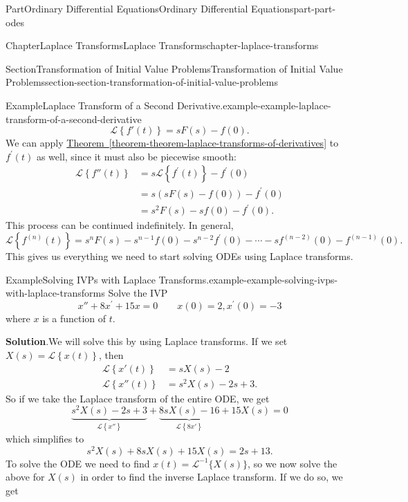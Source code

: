 \documentclass[twoside,10pt,]{book}
\newcommand{\blocktitlefont}{\relax}
\newcommand{\xreffont}{\relax}
\numberwithin{equation}{part}
\newcommand{\Laplace}[1]{\mathcal{L}\set{#1}}
\newcommand{\set}[1]{\left\{ #1 \right\}}
\newcommand{\qq}[1]{\quad\text{#1}\quad}
\begin{document}
\begin{partptx}{Part}{Ordinary Differential Equations}{}{Ordinary Differential Equations}{}{}{part-part-odes}
\begin{chapterptx}{Chapter}{Laplace Transforms}{}{Laplace Transforms}{}{}{chapter-laplace-transforms}
\begin{sectionptx}{Section}{Transformation of Initial Value Problems}{}{Transformation of Initial Value Problems}{}{}{section-section-transformation-of-initial-value-problems}
\begin{example}{Example}{Laplace Transform of a Second Derivative.}{example-example-laplace-transform-of-a-second-derivative}
\begin{equation*}
\Laplace{f'(t)} = sF(s)-f(0).
\end{equation*}
We can apply \hyperref[theorem-theorem-laplace-transforms-of-derivatives]{Theorem~{\xreffont\ref{theorem-theorem-laplace-transforms-of-derivatives}}} to \(f^\prime(t)\) as well, since it must also be piecewise smooth:%
\begin{align*}
\Laplace{f''(t)} &= s\Laplace{f^\prime(t)} - f^\prime(0)\\
&= s(sF(s)-f(0)) - f^\prime(0)\\
&= s^{2}F(s) - sf(0) - f^\prime(0)\text{.}
\end{align*}
This process can be continued indefinitely. In general,%
\begin{equation*}
\Laplace{f^{(n)}(t)} = s^{n}F(s) - s^{n-1}f(0) - s^{n-2}f^\prime(0) - \cdots -sf^{(n-2)}(0) - f^{(n-1)}(0).
\end{equation*}
This gives us everything we need to start solving ODEs using Laplace transforms.%
\end{example}
\begin{example}{Example}{Solving IVPs with Laplace Transforms.}{example-example-solving-ivps-with-laplace-transforms}%
Solve the IVP%
\begin{equation*}
x''+8x^\prime+15x = 0 \qq{} x(0) = 2, x^\prime(0) = -3
\end{equation*}
where \(x\) is a function of \(t\).%
\par\smallskip%
\noindent\textbf{\blocktitlefont Solution}.\hypertarget{solution-example-solving-ivps-with-laplace-transforms-c}{}\quad{}We will solve this by using Laplace transforms. If we set \(X(s) = \Laplace{x(t)}\), then%
\begin{align*}
\Laplace{x'(t)} &= sX(s) - 2\\
\Laplace{x''(t)} &= s^{2}X(s) - 2s +3\text{.}
\end{align*}
So if we take the Laplace transform of the entire ODE, we get%
\begin{equation*}
\underbrace{s^{2}X(s) - 2s + 3}_{\Laplace{x''}} + \underbrace{8sX(s) - 16}_{\Laplace{8x'}} + 15X(s) = 0
\end{equation*}
which simplifies to%
\begin{equation*}
s^{2}X(s)+8sX(s)+15X(s) = 2s+13.
\end{equation*}
To solve the ODE we need to find \(x(t) = \mathcal{L}^{-1}\{X(s)\}\), so we now solve the above for \(X(s)\) in order to find the inverse Laplace transform. If we do so, we get%

\end{example}
\end{sectionptx}
\end{chapterptx}
\end{partptx}
\end{document}
